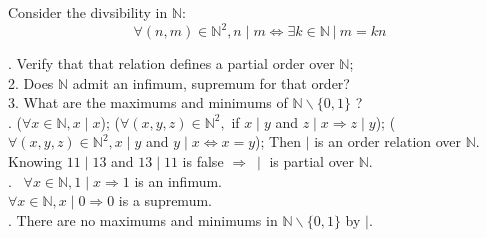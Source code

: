 \documentclass{article}
\begin{document}
\noindent Consider the divsibility in $\mathbb{N}$:\\
\[
\forall (n, m) \in \mathbb{N}^2, n \mid m \iff
\exists k \in \mathbb{N} \ | \ m = kn
\]

. Verify that that relation defines a partial order
over $\mathbb{N}$;\\
2. Does  $\mathbb{N}$ admit an infimum, supremum for that
order?\\
3. What are the maximums and minimums of $\mathbb{N}
\backslash \{0, 1\}$ ?\\

. ($\forall x \in \mathbb{N}, x \mid x$);
($\forall (x, y, z) \in \mathbb{N}^2, $ if $ x \mid y $ and
$ z \mid x \Rightarrow z \mid y$); ($\forall (x, y, z)
\in \mathbb{N}^2, x \mid y $ and $ y \mid x \iff x = y$); Then $\mid$ is an order relation over $\mathbb{N}$.\\
Knowing $11 \mid 13 $ and $ 13 \mid 11$ is false
$\Rightarrow \ \mid $ is partial over $\mathbb{N}$.\\

. \ $\forall x \in \mathbb{N}, 1 \mid x
\Rightarrow 1 $ is an infimum.\\
\indent $\forall x \in \mathbb{N}, x \mid 0 \Rightarrow 0 $
is a supremum.\\

. There are no maximums and minimums in $\mathbb{N} \backslash \{0, 1\} $ by $ \mid $.
\end{document}
